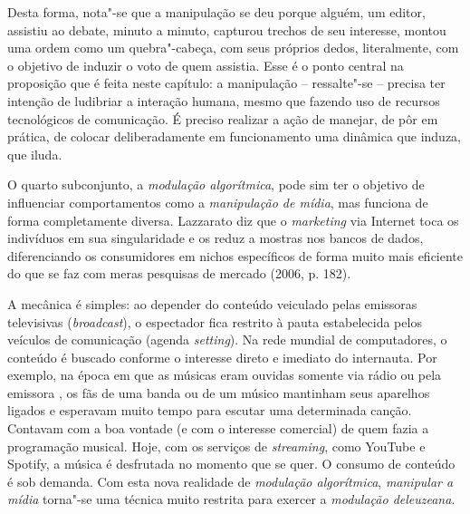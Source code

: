 Desta forma, nota"-se que a manipulação se deu porque alguém, um editor,
assistiu ao debate, minuto a minuto, capturou trechos de seu interesse,
montou uma ordem como um quebra"-cabeça, com seus próprios dedos,
literalmente, com o objetivo de induzir o voto de quem assistia. Esse é
o ponto central na proposição que é feita neste capítulo: a manipulação
-- ressalte"-se -- precisa ter intenção de ludibriar a interação humana,
mesmo que fazendo uso de recursos tecnológicos de comunicação. É preciso
realizar a ação de manejar, de pôr em prática, de colocar
deliberadamente em funcionamento uma dinâmica que induza, que iluda.

O quarto subconjunto, a \emph{modulação algorítmica}, pode sim ter o
objetivo de influenciar comportamentos como a \emph{manipulação de
mídia}, mas funciona de forma completamente diversa. Lazzarato diz que o
\emph{marketing} via Internet toca os indivíduos em sua singularidade e
os reduz a mostras nos bancos de dados, diferenciando os consumidores em
nichos específicos de forma muito mais eficiente do que se faz com meras
pesquisas de mercado (2006, p. 182).

A mecânica é simples: ao depender do conteúdo veiculado pelas emissoras
televisivas (\emph{broadcast}), o espectador fica restrito à pauta
estabelecida pelos veículos de comunicação (agenda \emph{setting}). Na
rede mundial de computadores, o conteúdo é buscado conforme o interesse
direto e imediato do internauta. Por exemplo, na época em que as músicas
eram ouvidas somente via rádio ou pela emissora , os fãs de uma banda
ou de um músico mantinham seus aparelhos ligados e esperavam muito tempo
para escutar uma determinada canção. Contavam com a boa vontade (e com o
interesse comercial) de quem fazia a programação musical. Hoje, com os
serviços de \emph{streaming}, como YouTube e Spotify, a música é
desfrutada no momento que se quer. O consumo de conteúdo é sob demanda.
Com esta nova realidade de \emph{modulação algorítmica}, \emph{manipular
a mídia} torna"-se uma técnica muito restrita para exercer a
\emph{modulação deleuzeana}.

